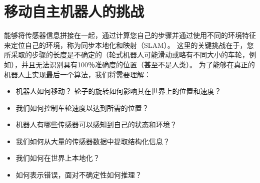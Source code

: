 \section{移动自主机器人的挑战}


能够将传感器信息拼接在一起，通过计算您自己的步骤并通过使用不同的环境特征来定位自己的环境，称为同步本地化和映射（SLAM）。 这里的关键挑战在于，您所采取的步骤的长度是不确定的（轮式机器人可能滑动或略有不同大小的车轮，例如），并且无法识别具有100％准确度的位置（甚至不是人类）。 为了能够在真正的机器人上实现最后一个算法，我们将需要理解：


\begin{itemize}
\item 机器人如何移动？ 轮子的旋转如何影响其在世界上的位置和速度？
\item 我们如何控制车轮速度以达到所需的位置？
\item 机器人有哪些传感器可以感知到自己的状态和环境？
\item 我们如何从大量的传感器数据中提取结构化信息？
\item 我们如何在世界上本地化？
\item 如何表示错误，面对不确定性如何推理？
\end{itemize}

